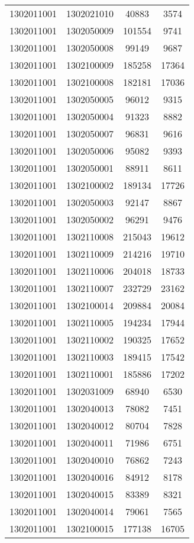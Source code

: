 \begin{longtable}[h]{llcc}
		1302011001 & 1302021010 & 40883 & 3574\\
		1302011001 & 1302050009 & 101554 & 9741\\
		1302011001 & 1302050008 & 99149 & 9687\\
		1302011001 & 1302100009 & 185258 & 17364\\
		1302011001 & 1302100008 & 182181 & 17036\\
		1302011001 & 1302050005 & 96012 & 9315\\
		1302011001 & 1302050004 & 91323 & 8882\\
		1302011001 & 1302050007 & 96831 & 9616\\
		1302011001 & 1302050006 & 95082 & 9393\\
		1302011001 & 1302050001 & 88911 & 8611\\
		1302011001 & 1302100002 & 189134 & 17726\\
		1302011001 & 1302050003 & 92147 & 8867\\
		1302011001 & 1302050002 & 96291 & 9476\\
		1302011001 & 1302110008 & 215043 & 19612\\
		1302011001 & 1302110009 & 214216 & 19710\\
		1302011001 & 1302110006 & 204018 & 18733\\
		1302011001 & 1302110007 & 232729 & 23162\\
		1302011001 & 1302100014 & 209884 & 20084\\
		1302011001 & 1302110005 & 194234 & 17944\\
		1302011001 & 1302110002 & 190325 & 17652\\
		1302011001 & 1302110003 & 189415 & 17542\\
		1302011001 & 1302110001 & 185886 & 17202\\
		1302011001 & 1302031009 & 68940 & 6530\\
		1302011001 & 1302040013 & 78082 & 7451\\
		1302011001 & 1302040012 & 80704 & 7828\\
		1302011001 & 1302040011 & 71986 & 6751\\
		1302011001 & 1302040010 & 76862 & 7243\\
		1302011001 & 1302040016 & 84912 & 8178\\
		1302011001 & 1302040015 & 83389 & 8321\\
		1302011001 & 1302040014 & 79061 & 7565\\
		1302011001 & 1302100015 & 177138 & 16705\\

\end{longtable}
